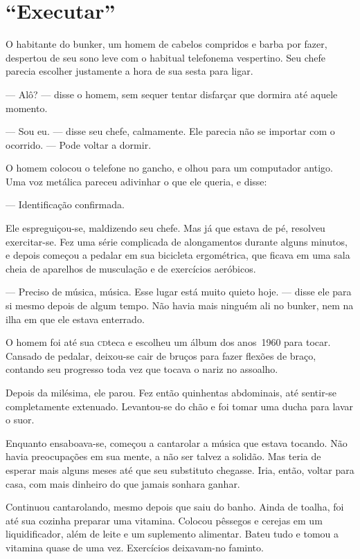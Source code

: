 \chapter{“Executar”}


O habitante do bunker, um homem de cabelos compridos e barba por fazer,
despertou de seu sono leve com o habitual telefonema vespertino. Seu
chefe parecia escolher justamente a hora de sua sesta para ligar.

--- Alô? --- disse o homem, sem sequer tentar disfarçar que dormira até
aquele momento.

--- Sou eu. --- disse seu chefe, calmamente. Ele parecia não se importar
com o ocorrido. --- Pode voltar a dormir.

O homem colocou o telefone no gancho, e olhou para um computador antigo.
Uma voz metálica pareceu adivinhar o que ele queria, e disse:

--- Identificação confirmada.

Ele espreguiçou-se, maldizendo seu chefe. Mas já que estava de pé,
resolveu exercitar-se. Fez uma série complicada de alongamentos durante
alguns minutos, e depois começou a pedalar em sua bicicleta ergométrica,
que ficava em uma sala cheia de aparelhos de musculação e de exercícios
aeróbicos.

--- Preciso de música, música. Esse lugar está muito quieto hoje. ---
disse ele para si mesmo depois de algum tempo. Não havia mais ninguém
ali no bunker, nem na ilha em que ele estava enterrado.

O homem foi até sua \textsc{cd}teca e escolheu um álbum dos anos~1960
para tocar. Cansado de pedalar, deixou-se cair de bruços para fazer
flexões de braço, contando seu progresso toda vez que tocava o nariz no
assoalho.

Depois da milésima, ele parou. Fez então quinhentas abdominais, até
sentir-se completamente extenuado. Levantou-se do chão e foi tomar uma
ducha para lavar o suor.

Enquanto ensaboava-se, começou a cantarolar a música que estava tocando.
Não havia preocupações em sua mente, a não ser talvez a solidão. Mas
teria de esperar mais alguns meses até que seu substituto chegasse.
Iria, então, voltar para casa, com mais dinheiro do que jamais sonhara
ganhar.

Continuou cantarolando, mesmo depois que saiu do banho. Ainda de toalha,
foi até sua cozinha preparar uma vitamina. Colocou pêssegos e cerejas em
um liquidificador, além de leite e um suplemento alimentar. Bateu tudo e
tomou a vitamina quase de uma vez. Exercícios deixavam-no faminto.


